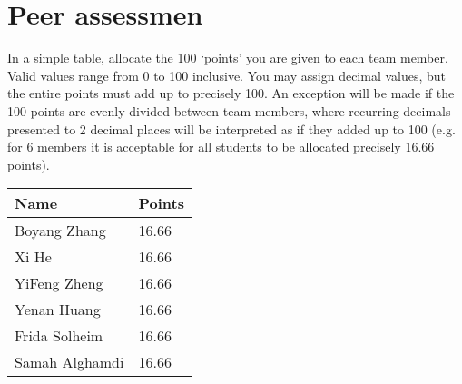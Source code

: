 \documentclass{article}
\begin{document}
\section{Peer assessmen}
In a simple table, allocate the 100 ‘points’ you are given to each team member. Valid values range from 0 to 100 inclusive. You may assign decimal values, but the entire points must add up to precisely 100. An exception will be made if the 100 points are evenly divided between team members, where recurring decimals presented to 2 decimal places will be interpreted as if they added up to 100 (e.g. for 6 members it is acceptable for all students to be allocated precisely 16.66 points).


\begin{center}
\begin{tabular}{ | m{3cm}| m{1.3cm} | }
\hline
\textbf{Name} & \textbf{Points}  \\
\hline
Boyang Zhang & 16.66  \\
\hline
Xi He & 16.66  \\
\hline
YiFeng Zheng & 16.66 \\
\hline
Yenan Huang & 16.66 \\
\hline
Frida Solheim & 16.66 \\
\hline
Samah Alghamdi & 16.66 \\
\hline
\end{tabular}
\end{center}
\end{document}
